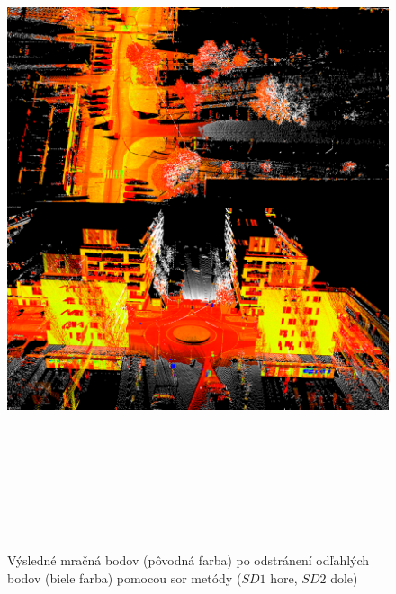 \newpage\vfill
\begin{figure}[ht]
  \centering
  \includegraphics[width=16cm, height=20cm]{img/outlier_removal.png}
  \caption{Výsledné mračná bodov (pôvodná farba) po odstránení odľahlých bodov (biele farba) pomocou \acrshort{sor} metódy ($SD1$ hore, $SD2$ dole)} 
  \label{fig:outlier}
\end{figure} 
\vfill\clearpage

